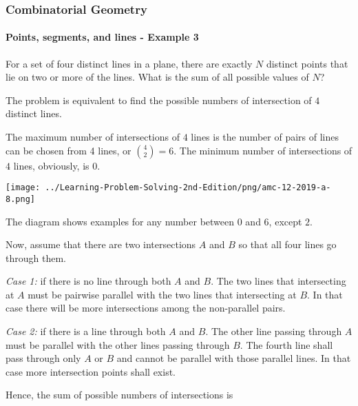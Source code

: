 \documentclass[8pt,xcolor=table,dvipsnames]{beamer}
\begin{document}
\begin{frame}[t]
    \frametitle{Combinatorial Geometry}
    \framesubtitle{Points, segments, and lines - Example 3}
    \begin{example}[AMC 12 2019/A/8]
        For a set of four distinct lines in a plane, there are exactly $N$ distinct points that lie on two or more of the lines.
        What is the sum of all possible values of $N$?
    \end{example}

    \begin{overprint}
        The problem is equivalent to find the possible numbers of intersection of $4$ distinct lines. 

        \bigbreak
        The maximum number of intersections of $4$ lines is the number of pairs of lines can be chosen from 4 lines, or $\binom{4}{2}=6$. 
        The minimum number of intersections of $4$ lines, obviously, is $0.$
        \begin{center}
            \texttt{[image: ../Learning-Problem-Solving-2nd-Edition/png/amc-12-2019-a-8.png]}
        \end{center}
        The diagram shows examples for any number between $0$ and $6$, except $2$.
    
        Now, assume that there are two intersections $A$ and $B$ so that all four lines go through them.

        \bigbreak
        \textit{Case 1:} if there is no line through both $A$ and $B$. The two lines that intersecting at $A$ must be pairwise parallel
        with the two lines that intersecting at $B$. In that case there will be more intersections among the non-parallel pairs.
    
        \bigbreak
        \textit{Case 2:} if there is a line through both $A$ and $B$. The other line passing through $A$ must be parallel
        with the other lines passing through $B$. The fourth line shall pass through only $A$ or $B$ and cannot be parallel
        with those parallel lines. In that case more intersection points shall exist.
    
        \bigbreak
        Hence, the sum of possible numbers of intersections is 
    \end{overprint}
\end{frame}
\end{document}
